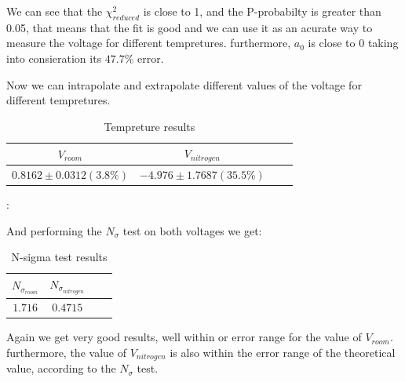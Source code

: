 \documentclass[12pt,a4paper]{report}
\begin{document}
  \begin{table}[htbp]
    \centering
    \label{tab:partA_summary}
    \caption{Part B results}
  \end{table}
  We can see that the $\chi _{reduced}^2$ is close to 1, and the P-probabilty is greater than 0.05, that means that the fit is good and we can use it as an acurate way to measure the voltage for different tempretures. furthermore, $a_0$ is close to 0 taking into consieration its $47.7 \%$ error. 

  \pagebreak
  Now we can intrapolate and extrapolate different values of the voltage for different tempretures.
  \begin{table}[htbp]
    \centering
    \label{Part B tempreture results}
    \begin{tabular}{@{}cccc@{}}
      \toprule
       $V_{room}$ & $V_{nitrogen}$ \\
      \midrule
      $0.8162 \pm 0.0312 (3.8 \%)$ & $-4.976 \pm 1.7687 (35.5 \%)$ \\
      \bottomrule
    \end{tabular}
    \caption{Tempreture results}
\end{table}:

And performing the $N_\sigma$ test on both voltages we get:

\begin{table}[htbp]
    \centering
    \label{Part B N-sigma test results}
    \begin{tabular}{@{}cccc@{}}
      \toprule
       $N_{\sigma_{room}} $& $N_{\sigma_{nitrogen}}$ \\
      \midrule
      $1.716$ & $0.4715$ \\
      \bottomrule
    \end{tabular}
    \caption{N-sigma test results}

\end{table}
Again we get very good results, well within or error range for the value of $V_{room}$. furthermore, the value of $V_{nitrogen}$ is also within the error range of the theoretical value, according to the $N_\sigma$ test.
\end{document}
